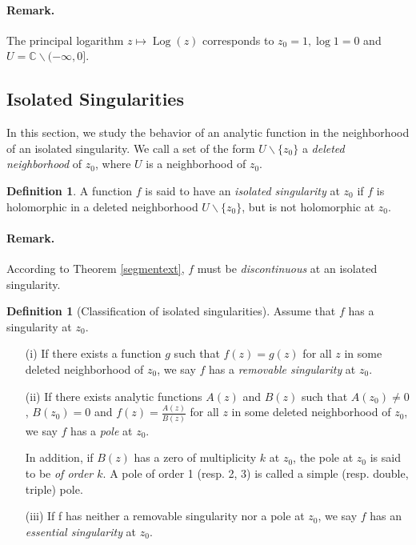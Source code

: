 \documentclass{article}
\numberwithin{equation}{section}
\newcommand{\bbC}{\mathbb{C}}
\DeclareMathOperator{\Log}{Log}
\theoremstyle{plain}
\theoremstyle{definition}
\newtheorem{definition}[theorem]{Definition}
\begin{document}
\paragraph{Remark.} The principal logarithm $z\mapsto\Log(z)$ corresponds to $z_0=1,\log 1=0$ and $U=\bbC\backslash(-\infty,0]$.

\subsection{Isolated Singularities}
In this section, we study the behavior of an analytic function in the neighborhood of an isolated singularity. We call a set of the form $U\backslash\{z_0\}$ a \textit{deleted neighborhood} of $z_0$, where $U$ is a neighborhood of $z_0$.
\begin{definition}
A function $f$ is said to have an \textit{isolated singularity} at $z_0$ if $f$ is holomorphic in a deleted neighborhood $U\backslash\{z_0\}$, but is not holomorphic at $z_0$.
\end{definition}
\paragraph{Remark.} According to Theorem \ref{segmentext}, $f$ must be \textit{discontinuous} at an isolated singularity.

\begin{definition}[Classification of isolated singularities]\label{singclass}
Assume that $f$ has a singularity at $z_0$. 
\begin{itemize}
\item[(i)] If there exists a function $g$ such that $f(z)=g(z)$ for all $z$ in some deleted neighborhood of $z_0$, we say $f$ has a \textit{removable singularity} at $z_0$.
\item[(ii)] If there exists analytic functions $A(z)$ and $B(z)$ such that $A(z_0)\neq 0$, $B(z_0)=0$ and $f(z)=\frac{A(z)}{B(z)}$ for all $z$ in some deleted neighborhood of $z_0$, we say $f$ has a \textit{pole} at $z_0$.

In addition, if $B(z)$ has a zero of multiplicity $k$ at $z_0$, the pole at $z_0$ is said to be \textit{of order $k$}. A pole of order 1 (resp. 2, 3) is called a simple (resp. double, triple) pole.
\item[(iii)] If f has neither a removable singularity nor a pole at $z_0$, we say $f$ has an \textit{essential singularity} at $z_0$.
\end{itemize}
\end{definition}
\end{document}

